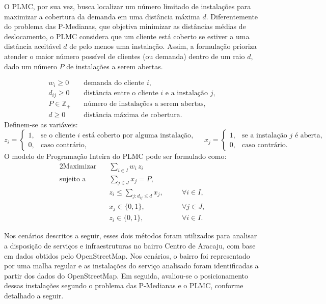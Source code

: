 \documentclass[12pt]{article}
\begin{document}
O PLMC, por sua vez, busca localizar um número limitado de instalações para maximizar a cobertura da demanda em uma distância máxima \(d\). Diferentemente do problema das P-Medianas, que objetiva minimizar as distâncias médias de deslocamento, o PLMC considera que um cliente está coberto se estiver a uma distância aceitável \(d\) de pelo menos uma instalação. Assim, a formulação prioriza atender o maior número possível de clientes (ou demanda) dentro de um raio \(d\), dado um número \(P\) de instalações a serem abertas.

\[
\begin{aligned}
w_i \ge 0 &\quad \text{demanda do cliente } i,\\
d_{ij} \ge 0 &\quad \text{distância entre o cliente $i$ e a instalação $j$},\\
P \in \mathbb{Z}_{+} &\quad \text{número de instalações a serem abertas},\\
d \ge 0 &\quad \text{distância máxima de cobertura}.
\end{aligned}
\]
Definem-se as variáveis:
\[
z_i = 
\begin{cases}
1, & \text{se o cliente $i$ está coberto por alguma instalação}, \\
0, & \text{caso contrário},
\end{cases}
\quad
x_j =
\begin{cases}
1, & \text{se a instalação $j$ é aberta}, \\
0, & \text{caso contrário}.
\end{cases}
\]
O modelo de Programação Inteira do PLMC pode ser formulado como:
\begin{alignat*}{2}
\text{Maximizar}\quad
& \sum_{i \in I} w_i\,z_i \\
\text{sujeito a}\quad
& \sum_{j \in J} x_j = P, \\
& z_i \le \sum_{j : d_{ij} \le d} x_j, && \quad \forall i \in I, \\
& x_j \in \{0,1\}, && \quad \forall j \in J, \\
& z_i \in \{0,1\}, && \quad \forall i \in I.
\end{alignat*}

Nos cenários descritos a seguir, esses dois métodos foram utilizados para analisar a disposição de serviços e infraestruturas no bairro Centro de Aracaju, com base em dados obtidos pelo OpenStreetMap. Nos cenários, o bairro foi representado por uma malha regular e as instalações do serviço analisado foram identificadas a partir dos dados do OpenStreetMap. Em seguida, avaliou-se o posicionamento dessas instalações segundo o problema das P-Medianas e o PLMC, conforme detalhado a seguir.
\end{document}
